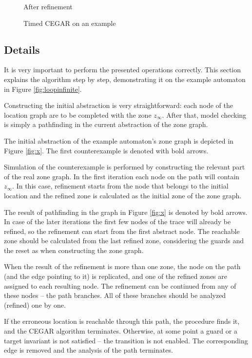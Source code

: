 \begin{figure} [h]
\begin{minipage} {0.25\linewidth}
 		\vspace*{5pt}%
 		\caption{After refinement}
 		\label{fig:loopref}
 	\end{minipage}
 	\caption{Timed CEGAR on an example}
 \end{figure}
 
 
\subsection{Details}

It is very important to perform the presented operations correctly. This section explains the algorithm step by step, demonstrating it on the example automaton in Figure \ref{fig:loopinfinite}.

Constructing the initial abstraction is very straightforward: each node of the location graph are to be completed with the zone $z_\infty$. After that, model checking is simply a pathfinding in the current abstraction of the zone graph.

\begin{example}
	The initial abstraction of the example automaton's zone graph is depicted in Figure \ref{fig:x}. The first counterexample is denoted with bold arrows.
\end{example}

Simulation of the counterexample is performed by constructing the relevant part of the real zone graph. In the first iteration each node on the path will contain $z_\infty$. In this case, refinement starts from the node that belongs to the initial location and the refined zone is calculated as the initial zone of the zone graph.

The result of pathfinding in the graph in Figure \ref{fig:x} is denoted by bold arrows. In case of the later iterations the first few nodes of the
trace will already be refined, so the refinement can start from the first
abstract node. The reachable zone should be calculated from the last refined zone,
considering the guards and the reset as when constructing the zone graph.

When the result of the refinement is more than one zone, the node on the path (and the edge pointing
to it) is replicated, and one of the refined zones are assigned
to each resulting node. The refinement can be continued from any of these nodes -- the path branches.
All of these branches should be analyzed (refined) one by one.

If the erroneous location is reachable through this path, the procedure finds it,
and the CEGAR algorithm terminates. Otherwise, at some point a guard or a target invariant
is not satisfied -- the transition is not enabled. The corresponding edge is removed and the analysis of the path terminates.

